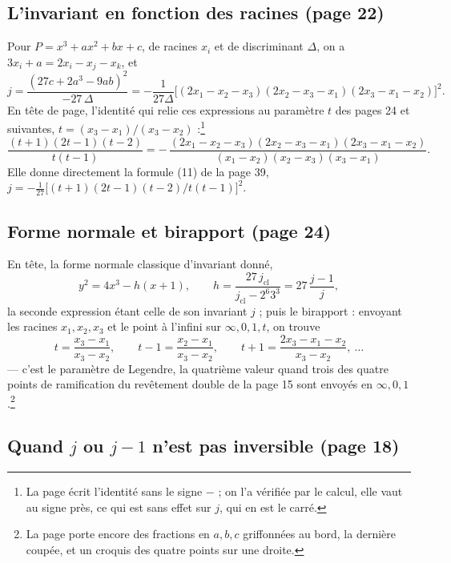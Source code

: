 \documentclass[11pt,a4paper]{article}
\begin{document}
\subsection*{L'invariant en fonction des racines (page 22)}

Pour $P = x^3 + ax^2 + bx + c$, de
racines $x_i$ et de discriminant $\Delta$, on a $3x_i + a = 2x_i - x_j - x_k$,
et
\[
j = \frac{(27c + 2a^3 - 9ab)^2}{-27\,\Delta}
= -\frac{1}{27\Delta}\bigl[(2x_1 - x_2 - x_3)(2x_2 - x_3 - x_1)(2x_3 - x_1 -
x_2)\bigr]^2.
\]
En tête de page, l'identité qui relie ces expressions au paramètre $t$ des pages
24 et suivantes, $t = (x_3 - x_1)/(x_3 - x_2)$ :\footnote{La page écrit l'identité sans le signe $-$ ; on l'a vérifiée par le
calcul, elle vaut au signe près, ce qui est sans effet sur $j$, qui en est le
carré.}
\[
\frac{(t+1)(2t-1)(t-2)}{t(t-1)}
= -\,\frac{(2x_1 - x_2 - x_3)(2x_2 - x_3 - x_1)(2x_3 - x_1 - x_2)}{(x_1 -
x_2)(x_2 - x_3)(x_3 - x_1)} .
\]
Elle donne directement la formule (11) de la page 39, $j =
-\frac{1}{27}\bigl[(t+1)(2t-1)(t-2)/t(t-1)\bigr]^2$.

\subsection*{Forme normale et birapport (page 24)}

En tête, la forme normale
classique d'invariant donné,
\[
y^2 = 4x^3 - h(x+1), \qquad h = \frac{27\,j_{\mathrm{cl}}}{j_{\mathrm{cl}} - 2^6
3^3} = 27\,\frac{j-1}{j},
\]
la seconde expression étant celle de son invariant $j$ ; puis le birapport :
envoyant les racines $x_1, x_2, x_3$ et le point à l'infini sur $\infty, 0, 1,
t$, on trouve
\[
t = \frac{x_3 - x_1}{x_3 - x_2}, \qquad t - 1 = \frac{x_2 - x_1}{x_3 - x_2},
\qquad t + 1 = \frac{2x_3 - x_1 - x_2}{x_3 - x_2}, \ \ldots
\]
--- c'est le paramètre de Legendre, la quatrième valeur quand trois des quatre
points de ramification du revêtement double de la page 15 sont envoyés en
$\infty, 0, 1$.\footnote{La page porte encore des fractions en $a, b, c$
griffonnées au bord, la dernière coupée, et un croquis des quatre points sur
une droite.}

\subsection*{Quand $j$ ou $j - 1$ n'est pas inversible (page 18)}
\end{document}
